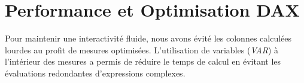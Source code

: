 \section{Performance et Optimisation DAX}

Pour maintenir une interactivité fluide, nous avons évité les colonnes calculées lourdes au profit de mesures optimisées. L'utilisation de variables (\textit{VAR}) à l'intérieur des mesures a permis de réduire le temps de calcul en évitant les évaluations redondantes d'expressions complexes.
